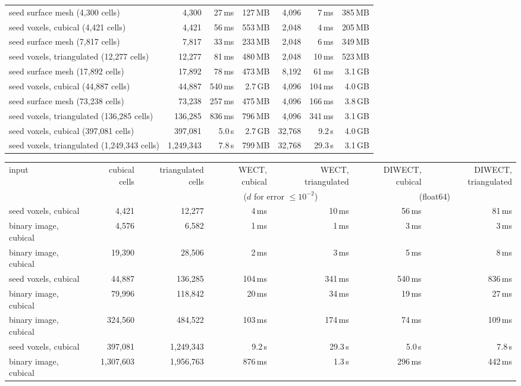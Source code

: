 \begin{tabular}{lrrrrrr}
seed surface mesh (4,300 cells) & 4,300 & 27\,ms & 127\,MB & 4,096 & 7\,ms & 385\,MB \\
seed voxels, cubical (4,421 cells) & 4,421 & 56\,ms & 553\,MB & 2,048 & 4\,ms & 205\,MB \\
seed surface mesh (7,817 cells) & 7,817 & 33\,ms & 233\,MB & 2,048 & 6\,ms & 349\,MB \\
seed voxels, triangulated (12,277 cells) & 12,277 & 81\,ms & 480\,MB & 2,048 & 10\,ms & 523\,MB \\
seed surface mesh (17,892 cells) & 17,892 & 78\,ms & 473\,MB & 8,192 & 61\,ms & 3.1\,GB \\
seed voxels, cubical (44,887 cells) & 44,887 & 540\,ms & 2.7\,GB & 4,096 & 104\,ms & 4.0\,GB \\
seed surface mesh (73,238 cells) & 73,238 & 257\,ms & 475\,MB & 4,096 & 166\,ms & 3.8\,GB \\
seed voxels, triangulated (136,285 cells) & 136,285 & 836\,ms & 796\,MB & 4,096 & 341\,ms & 3.1\,GB \\
seed voxels, cubical (397,081 cells) & 397,081 & 5.0\,s & 2.7\,GB & 32,768 & 9.2\,s & 4.0\,GB \\
seed voxels, triangulated (1,249,343 cells) & 1,249,343 & 7.8\,s & 799\,MB & 32,768 & 29.3\,s & 3.1\,GB \\
\bottomrule
\end{tabular}

\begin{tabular}{lrrrrrr}
\toprule
input & cubical cells & triangulated cells & WECT, cubical & WECT, triangulated & DIWECT, cubical & DIWECT, triangulated \\
 & & & \multicolumn{2}{c}{($d$ for error $\leq 10^{-2}$)} & \multicolumn{2}{c}{(float64)} \\
\midrule
seed voxels, cubical & 4,421 & 12,277 & 4\,ms & 10\,ms & 56\,ms & 81\,ms \\
binary image, cubical & 4,576 & 6,582 & 1\,ms & 1\,ms & 3\,ms & 3\,ms \\
binary image, cubical & 19,390 & 28,506 & 2\,ms & 3\,ms & 5\,ms & 8\,ms \\
seed voxels, cubical & 44,887 & 136,285 & 104\,ms & 341\,ms & 540\,ms & 836\,ms \\
binary image, cubical & 79,996 & 118,842 & 20\,ms & 34\,ms & 19\,ms & 27\,ms \\
binary image, cubical & 324,560 & 484,522 & 103\,ms & 174\,ms & 74\,ms & 109\,ms \\
seed voxels, cubical & 397,081 & 1,249,343 & 9.2\,s & 29.3\,s & 5.0\,s & 7.8\,s \\
binary image, cubical & 1,307,603 & 1,956,763 & 876\,ms & 1.3\,s & 296\,ms & 442\,ms \\
\bottomrule
\end{tabular}

